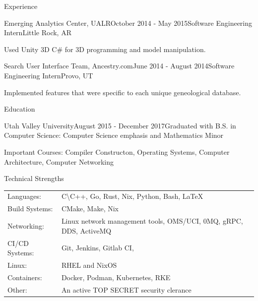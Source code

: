 \documentclass{resume} %
\newcommand{\btab}[2]{
  \bgroup
  \def\arraystretch{#1}
  \begin{tabular}{#2}
}
\newcommand{\etab}{
  \end{tabular} \smallskip
  \egroup
}
\begin{document}
\begin{rSection}{Experience}
  \begin{rSubsection}{Emerging Analytics Center, UALR}{October 2014 - May 2015}{Software Engineering Intern}{Little Rock, AR}
  \item Used Unity 3D C\# for 3D programming and model manipulation.
  \end{rSubsection}

  \begin{rSubsection}{Search User Interface Team, Ancestry.com}{June 2014 - August 2014}{Software Engineering Intern}{Provo, UT}
  \item Implemented features that were specific to each unique geneological database.
  \end{rSubsection}

\end{rSection}


\begin{rSection}{Education}

  \begin{rSubsection}{Utah Valley University}{August 2015 - December 2017}{Graduated with B.S. in Computer Science: Computer Science emphasis and Mathematics Minor}
  \item Important Courses: Compiler Constructon, Operating Systems, Computer Architecture, Computer Networking
  \end{rSubsection}
  


\end{rSection}

\begin{rSection}{Technical Strengths}


  \btab{1.1}{ l l }
  Languages: & C\textbackslash C++, Go, Rust, Nix, Python, Bash, \LaTeX \\
  Build Systems: & CMake, Make, Nix \\
  Networking: & Linux network management tools, OMS/UCI, 0MQ, gRPC, DDS, ActiveMQ \\
  CI/CD Systems: & Git, Jenkins, Gitlab CI,  \\
  Linux: & RHEL and NixOS \\
  Containers: & Docker, Podman, Kubernetes, RKE \\
  Other: & An active TOP SECRET security clerance \\
  \etab

\end{rSection}
\end{document}
